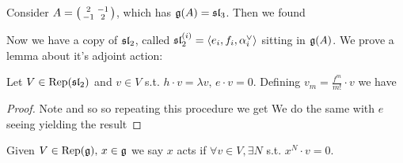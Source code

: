 \documentclass{article}
\begin{document}
\begin{example}
Consider $A=\begin{psmallmatrix} 2 & -1 \\ -1 & 2 \end{psmallmatrix}$, which has $\mathfrak{g}(A) = \mathfrak{sl}_3$. Then we found 
\end{example}



Now we have a copy of $\mathfrak{sl}_2$, called $\mathfrak{sl}_2^{(i)} = \left\langle e_i,f_i,\alpha_i^\vee \right\rangle$ sitting in $\mathfrak{g}(A)$. We prove a lemma about it's adjoint action:

\begin{lemma}
	Let $V \in \operatorname{Rep}(\mathfrak{sl}_2)$ and $v \in V$ s.t. $h \cdot v = \lambda v,\, e \cdot v = 0$. Defining $v_m = \frac{f^m}{m!} \cdot v$ we have 
\end{lemma}
\begin{proof}
	Note 
and so so repeating this procedure we get 
We do the same with $e$ seeing 
yielding the result
\end{proof}
\begin{comment}
 If we make the definitions $v = f_j, \theta_{ij} = \ad(f_i)^{1-a_{ij}}(f_j)$, we can also give an action of $\mf{sl}_2^{(i)}$ on $v$ by 
\begin{itemize}
    \item $f_i \cdot v = \ad(f_i)(v)$
    \item $\alpha_i^\vee \cdot v = \comm[\alpha_i^\vee]{f_j} = -a_{ij}v$
    \item $e_i \cdot v = \comm[e_i]{f_j} = 0$
\end{itemize}
We then have an action $\mf{sl}_2 \lact V \ni v$ s.t. $h\cdot v = \lambda v$, $e \cdot v = 0$, then 
\eq{
v_m &= \frac{f^m}{m!}v \\
h \cdot v_m &= (\lambda - m) v_m
}
\end{comment}

\begin{definition}
	Given $V \in \operatorname{Rep}(\mathfrak{g}), \, x \in \mathfrak{g}$ we say $x$ acts  if $\forall v \in V, \exists N$ s.t. $x^N \cdot v =0$.
\end{definition}
\end{document}

